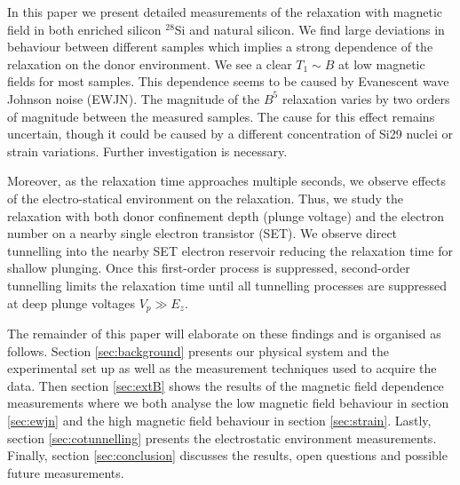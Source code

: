 In this paper we present detailed measurements of the relaxation with magnetic field in both enriched silicon $^{28}$Si and natural silicon. We find large deviations in behaviour between different samples which implies a strong dependence of the relaxation on the donor environment. We see a clear $T_1\sim B$ at low magnetic fields for most samples. This dependence seems to be caused by Evanescent wave Johnson noise (EWJN). The magnitude of the $B^5$ relaxation varies by two orders of magnitude between the measured samples. The cause for this effect remains uncertain, though it could be caused by a different concentration of Si29 nuclei or strain variations. Further investigation is necessary. 

Moreover, as the relaxation time approaches multiple seconds, we observe effects of the electro-statical environment on the relaxation. Thus, we study the relaxation with both donor confinement depth (plunge voltage) and the electron number on a nearby single electron transistor (SET). We observe direct tunnelling into the nearby SET electron reservoir reducing the relaxation time for shallow plunging. Once this first-order process is suppressed, second-order tunnelling limits the relaxation time until all tunnelling processes are suppressed at deep plunge voltages $V_p\gg E_z$.


The remainder of this paper will elaborate on these findings and is organised as follows. Section \ref{sec:background} presents our physical system and the experimental set up as well as the measurement techniques used to acquire the data. Then section \ref{sec:extB} shows the results of the magnetic field dependence measurements where we both analyse the low magnetic field behaviour in section \ref{sec:ewjn} and the high magnetic field behaviour in section \ref{sec:strain}. Lastly, section \ref{sec:cotunnelling} presents the electrostatic environment measurements. Finally, section \ref{sec:conclusion} discusses the results, open questions and possible future measurements. 


